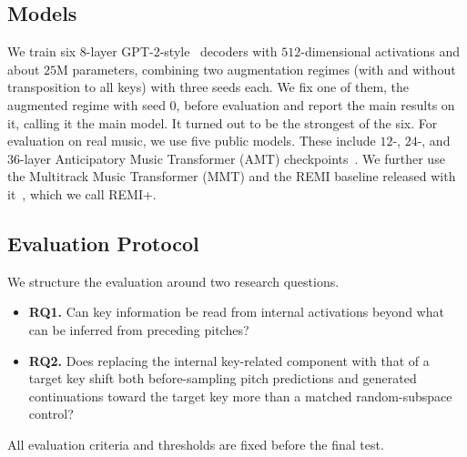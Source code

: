\documentclass{article}
\begin{document}
\subsection{Models}
\label{sec:models}
We train six $8$-layer GPT-2-style~\cite{radford2019gpt2} decoders with $512$-dimensional activations and about $25$M parameters, combining two augmentation regimes (with and without transposition to all keys) with three seeds each.
We fix one of them, the augmented regime with seed $0$, before evaluation and report the main results on it, calling it the main model.
It turned out to be the strongest of the six.
For evaluation on real music, we use five public models.
These include $12$-, $24$-, and $36$-layer Anticipatory Music Transformer (AMT) checkpoints~\cite{thickstun2023anticipatory}.
We further use the Multitrack Music Transformer (MMT) and the REMI baseline released with it~\cite{dong2023mmt}, which we call REMI+.

\subsection{Evaluation Protocol}
\label{sec:eval}
We structure the evaluation around two research questions.
\begin{itemize}
    \item \textbf{RQ1.} Can key information be read from internal activations beyond what can be inferred from preceding pitches?
    \item \textbf{RQ2.} Does replacing the internal key-related component with that of a target key shift both before-sampling pitch predictions and generated continuations toward the target key more than a matched random-subspace control?
\end{itemize}
All evaluation criteria and thresholds are fixed before the final test.
\end{document}
